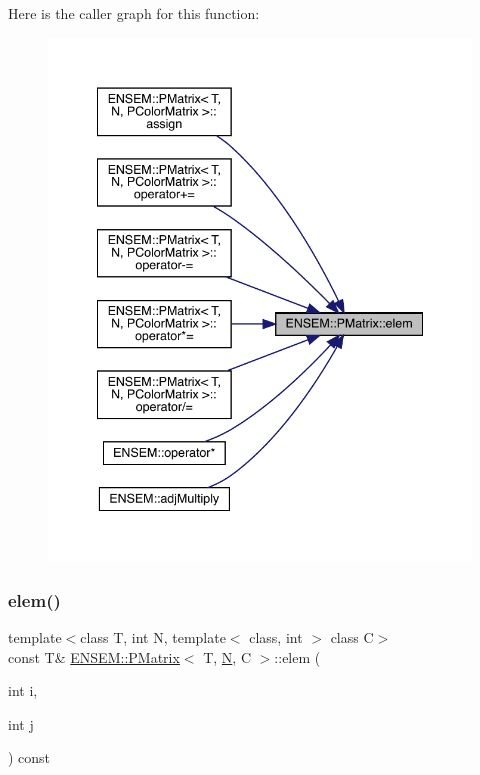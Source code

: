 Here is the caller graph for this function\+:
\nopagebreak
\begin{figure}[H]
\begin{center}
\leavevmode
\includegraphics[width=341pt]{d6/def/classENSEM_1_1PMatrix_a358c5f1cd954ddda32677d9ad8765ef2_icgraph}
\end{center}
\end{figure}
\mbox{\label{classENSEM_1_1PMatrix_a5cacb33b2dcd4c33a9d3a135528a8bdf}} 
\subsubsection{\texorpdfstring{elem()}{elem()}\hspace{0.1cm}{\footnotesize\ttfamily [4/6]}}
{\footnotesize\ttfamily template$<$class T, int N, template$<$ class, int $>$ class C$>$ \\
const T\& \mbox{\hyperlink{classENSEM_1_1PMatrix}{E\+N\+S\+E\+M\+::\+P\+Matrix}}$<$ T, \mbox{\hyperlink{adat__devel_2lib_2hadron_2operator__name__util_8cc_a7722c8ecbb62d99aee7ce68b1752f337}{N}}, C $>$\+::elem (\begin{DoxyParamCaption}\item[{int}]{i,  }\item[{int}]{j }\end{DoxyParamCaption}) const\hspace{0.3cm}{\ttfamily [inline]}}

